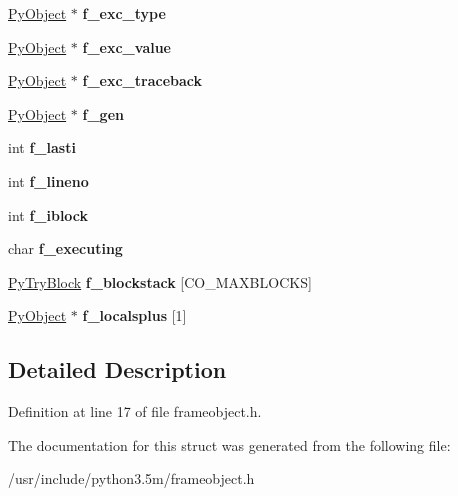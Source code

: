 \begin{DoxyCompactItemize}
\item 
\hyperlink{struct__object}{Py\+Object} $\ast$ {\bfseries f\+\_\+exc\+\_\+type}\hypertarget{struct__frame_adcf0f9edaf610db9885445be200d214a}{}\label{struct__frame_adcf0f9edaf610db9885445be200d214a}

\item 
\hyperlink{struct__object}{Py\+Object} $\ast$ {\bfseries f\+\_\+exc\+\_\+value}\hypertarget{struct__frame_a570b7add80d01e5421f2c52e413933dd}{}\label{struct__frame_a570b7add80d01e5421f2c52e413933dd}

\item 
\hyperlink{struct__object}{Py\+Object} $\ast$ {\bfseries f\+\_\+exc\+\_\+traceback}\hypertarget{struct__frame_ac1ad471552c27336a9c6f35a43a738bb}{}\label{struct__frame_ac1ad471552c27336a9c6f35a43a738bb}

\item 
\hyperlink{struct__object}{Py\+Object} $\ast$ {\bfseries f\+\_\+gen}\hypertarget{struct__frame_adf13ad303d30ef678c8cc643d23bb05e}{}\label{struct__frame_adf13ad303d30ef678c8cc643d23bb05e}

\item 
int {\bfseries f\+\_\+lasti}\hypertarget{struct__frame_aaebc36353db847803b7572b0b6868ccf}{}\label{struct__frame_aaebc36353db847803b7572b0b6868ccf}

\item 
int {\bfseries f\+\_\+lineno}\hypertarget{struct__frame_a584b2ea31653920d828df650b8223d11}{}\label{struct__frame_a584b2ea31653920d828df650b8223d11}

\item 
int {\bfseries f\+\_\+iblock}\hypertarget{struct__frame_a904da381a4a19f881f68d522fb8d9811}{}\label{struct__frame_a904da381a4a19f881f68d522fb8d9811}

\item 
char {\bfseries f\+\_\+executing}\hypertarget{struct__frame_a198dd7ce9b78d616496d2684550dafd2}{}\label{struct__frame_a198dd7ce9b78d616496d2684550dafd2}

\item 
\hyperlink{structPyTryBlock}{Py\+Try\+Block} {\bfseries f\+\_\+blockstack} \mbox{[}C\+O\+\_\+\+M\+A\+X\+B\+L\+O\+C\+KS\mbox{]}\hypertarget{struct__frame_a7bb5b52ff4d50835f67738158d7d9a02}{}\label{struct__frame_a7bb5b52ff4d50835f67738158d7d9a02}

\item 
\hyperlink{struct__object}{Py\+Object} $\ast$ {\bfseries f\+\_\+localsplus} \mbox{[}1\mbox{]}\hypertarget{struct__frame_a0c11cca41571107e3c56771eb385a146}{}\label{struct__frame_a0c11cca41571107e3c56771eb385a146}

\end{DoxyCompactItemize}


\subsection{Detailed Description}


Definition at line 17 of file frameobject.\+h.



The documentation for this struct was generated from the following file\+:\begin{DoxyCompactItemize}
\item 
/usr/include/python3.\+5m/frameobject.\+h\end{DoxyCompactItemize}
